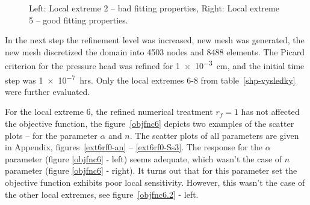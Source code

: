 \documentclass[review]{elsarticle}
\begin{document}
\begin{figure}
\label{rf0examples}
\caption{Left: Local extreme 2 -- bad fitting properties, Right: Local extreme 5 -- good fitting properties.}
\end{figure}

In the next step the refinement level was increased, new mesh was generated, the new mesh discretized the domain into 4503 nodes and 8488 elements. The Picard criterion for the pressure head was refined for \num{1e-3}~cm, and the initial time step was \num{1e-7}~hrs. Only the local extremes 6-8 from table~\ref{shp-vysledky} were further evaluated.

For the local extreme 6, the refined numerical treatment $r_f=1$ has not affected the objective function, the figure~\ref{objfnc6} depicts two examples of the scatter plots -- for the parameter $\alpha$ and $n$. The scatter plots of all parameters are given in Appendix, figures~\ref{ext6rf0-an} -- \ref{ext6rf0-Ss3}. The response for the $\alpha$ parameter (figure \ref{objfnc6} - left) seems adequate, which wasn't the case of $n$ parameter  (figure \ref{objfnc6} - right). It turns out that for this parameter set the objective function exhibits poor local sensitivity. However, this wasn't the case of the other local extremes, see figure~\ref{objfnc6.2} - left. 
\end{document}
